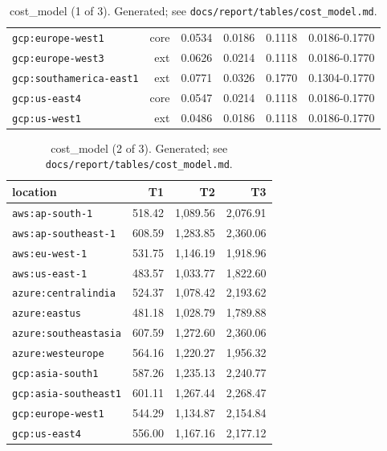 \begin{table}[t]
\begin{tabular}{lrrrrr}
\texttt{gcp:europe-west1} & core & 0.0534 & 0.0186 & 0.1118 & 0.0186-0.1770 \\
\texttt{gcp:europe-west3} & ext & 0.0626 & 0.0214 & 0.1118 & 0.0186-0.1770 \\
\texttt{gcp:southamerica-east1} & ext & 0.0771 & 0.0326 & 0.1770 & 0.1304-0.1770 \\
\texttt{gcp:us-east4} & core & 0.0547 & 0.0214 & 0.1118 & 0.0186-0.1770 \\
\texttt{gcp:us-west1} & ext & 0.0486 & 0.0186 & 0.1118 & 0.0186-0.1770 \\
\bottomrule
\end{tabular}
\caption{cost\_model (1 of 3). Generated; see \texttt{docs/report/tables/cost\_model.md}.}
\label{tab:cost_model-1}
\end{table}

\begin{table}[t]
\centering
\small
\begin{tabular}{lrrr}
\toprule
location & T1 & T2 & T3 \\
\midrule
\texttt{aws:ap-south-1} & 518.42 & 1,089.56 & 2,076.91 \\
\texttt{aws:ap-southeast-1} & 608.59 & 1,283.85 & 2,360.06 \\
\texttt{aws:eu-west-1} & 531.75 & 1,146.19 & 1,918.96 \\
\texttt{aws:us-east-1} & 483.57 & 1,033.77 & 1,822.60 \\
\texttt{azure:centralindia} & 524.37 & 1,078.42 & 2,193.62 \\
\texttt{azure:eastus} & 481.18 & 1,028.79 & 1,789.88 \\
\texttt{azure:southeastasia} & 607.59 & 1,272.60 & 2,360.06 \\
\texttt{azure:westeurope} & 564.16 & 1,220.27 & 1,956.32 \\
\texttt{gcp:asia-south1} & 587.26 & 1,235.13 & 2,240.77 \\
\texttt{gcp:asia-southeast1} & 601.11 & 1,267.44 & 2,268.47 \\
\texttt{gcp:europe-west1} & 544.29 & 1,134.87 & 2,154.84 \\
\texttt{gcp:us-east4} & 556.00 & 1,167.16 & 2,177.12 \\
\bottomrule
\end{tabular}
\caption{cost\_model (2 of 3). Generated; see \texttt{docs/report/tables/cost\_model.md}.}
\label{tab:cost_model-2}
\end{table}


